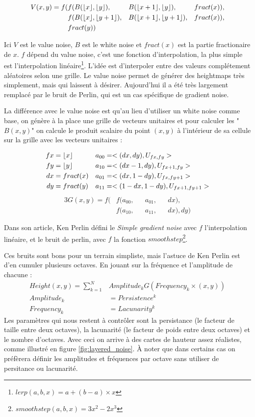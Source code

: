 \documentclass{EPUProjetDi}
\DeclarePairedDelimiter\floor{\lfloor}{\rfloor}%
\DeclarePairedDelimiter\fract{fract(}{)}
\begin{document}
\begin{alignat*}{3}
	V(x,y) =f( &f(B(\floor{x},\floor{y}), &&B(\floor{x+1},\floor{y}), &&\fract{x}),\\
			&f(B(\floor{x},\floor{y+1}), &&B(\floor{x+1},\floor{y+1}), &&\fract{x}),\\
			&\fract{y})
\end{alignat*}

Ici $V$ est le value noise, $B$ est le white noise et $fract(x)$ est la partie fractionaire de $x$. $f$ dépend du value noise, c'est une fonction d'interpolation, la plus simple est l'interpolation linéaire\footnote{$lerp(a,b,x) = a+(b-a)\times x$}.
L'idée est d'interpoler entre des valeurs complétement aléatoires selon une grille. Le value noise permet de générer des heightmaps très simplement, mais qui laissent à désirer. Aujourd'hui il a été très largement remplacé par le bruit de Perlin, qui est un cas spécifique de gradient noise.

La différence avec le value noise est qu'au lieu d'utiliser un white noise comme base, on génère à la place une grille de vecteurs unitaires et pour calculer les "$B(x,y)$" on calcule le produit scalaire du point $(x,y)$ à l'intérieur de sa cellule sur la grille avec les vecteurs unitaires :

\begin{align*}
	fx&=\floor{x} & a_{00}&=<(dx,dy), U_{fx,fy}>\\
	fy&=\floor{y} & a_{10}&=<(dx-1,dy), U_{fx+1,fy}>\\
	dx&=\fract{x} & a_{01}&=<(dx,1-dy), U_{fx,fy+1}>\\
	dy&=\fract{y} & a_{11}&=<(1-dx,1-dy), U_{fx+1,fy+1}>
\end{align*}
\begin{alignat*}{3}
	G(x,y) =f( &f(a_{00}, &&a_{01}, &&dx),\\
			&f(a_{10}, &&a_{11}, &&dx), dy)
\end{alignat*}

Dans son article\cite{perlinnoise}, Ken Perlin défini le \textit{Simple gradient noise} avec $f$ l'interpolation linéaire, et le bruit de perlin, avec $f$ la fonction $smoothstep$\footnote{$smoothstep(a,b,x) = 3x^2-2x^3$}.

Ces bruits sont bons pour un terrain simpliste, mais l'astuce de Ken Perlin est d'en cumuler plusieurs octaves. En jouant sur la fréquence et l'amplitude de chacune :
\begin{align*}
	Height(x,y) = \sum_{k=1}^{N}&Amplitude_k G(Frequency_k\times(x,y))\\
	Amplitude_k &= Persistence^k\\ 
	Frequency_k &= Lacunarity^k
\end{align*}
Les paramètres qui nous restent à contrôler sont la persistance (le facteur de taille entre deux octaves), la lacunarité (le facteur de poids entre deux octaves) et le nombre d'octaves. Avec ceci on arrive à des cartes de hauteur assez réalistes, comme illustré en figure \ref{fig:layered_noise}. À noter que dans certains cas on préfèrera définir les amplitudes et fréquences par octave sans utiliser de persitance ou lacunarité.
\end{document}
